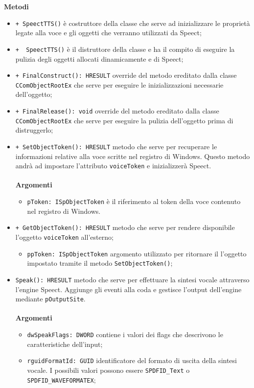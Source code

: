 \textbf{Metodi}
\begin{itemize}
	\item \texttt{+ SpeectTTS()} è costruttore della classe che serve ad inizializzare le proprietà legate alla voce e gli oggetti che verranno utilizzati da Speect;
	\item \texttt{+ ~SpeectTTS()} è il distruttore della classe e ha il compito di eseguire la pulizia degli oggetti allocati dinamicamente e di Speect; 
	\item \texttt{+ FinalConstruct(): HRESULT} override del metodo ereditato dalla classe \texttt{CComObjectRootEx} che serve per eseguire le inizializzazioni necessarie dell'oggetto;
	\item \texttt{+ FinalRelease(): void} override del metodo ereditato dalla classe \texttt{CComObjectRootEx} che serve per eseguire la pulizia dell'oggetto prima di distruggerlo;
	\item \texttt{+ SetObjectToken(): HRESULT} metodo che serve per recuperare le informazioni relative alla voce scritte nel registro di Windows. Questo metodo andrà ad impostare l'attributo \texttt{voiceToken} e inizializzerà Speect.\\\\
	\textbf{Argomenti}
	\begin{itemize}
		\item \texttt{pToken: ISpObjectToken} è il riferimento al token della voce contenuto nel registro di Windows. 
	\end{itemize}
	\item \texttt{+ GetObjectToken(): HRESULT} metodo che serve per rendere disponibile l'oggetto \texttt{voiceToken} all'esterno;
	\begin{itemize}
		\item \texttt{ppToken: ISpObjectToken} argomento utilizzato per ritornare il l'oggetto impostato tramite il metodo \texttt{SetObjectToken()};
	\end{itemize}
	\item \texttt{Speak(): HRESULT} metodo che serve per effettuare la sintesi vocale attraverso l'engine Speect. Aggiunge gli eventi alla coda e gestisce l'output dell'engine mediante \texttt{pOutputSite}.\\\\
	\textbf{Argomenti}
	\begin{itemize}
		\item \texttt{dwSpeakFlags: DWORD} contiene i valori dei flags che descrivono le caratteristiche dell'input;
		\item \texttt{rguidFormatId: GUID} identificatore del formato di uscita della sintesi vocale. I possibili valori possono essere \texttt{SPDFID\_Text} o \texttt{SPDFID\_WAVEFORMATEX};

\end{itemize}
\end{itemize}
